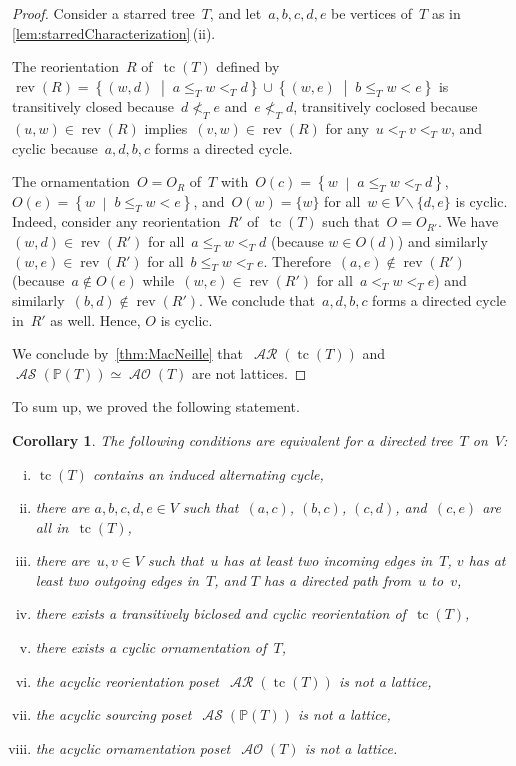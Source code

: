 \documentclass{amsart}
\newtheorem{corollary}[theorem]{Corollary}
\theoremstyle{definition}
\renewcommand{\c}[1]{\mathcal{#1}} %
\newcommand{\set}[2]{\left\{ #1 \;\middle|\; #2 \right\}} %
\newcommand{\ssm}{\smallsetminus} %
\DeclareMathOperator{\tc}{tc} %
\DeclareMathOperator{\AOrn}{\c{AO}}  %
\DeclareMathOperator{\AReori}{\c{AR}}  %
\DeclareMathOperator{\rev}{rev} %
\DeclareMathOperator{\ASour}{\mathcal{AS}}  %
\newcommand{\PP}{\mathbb P} %
\begin{document}
\begin{proof}
Consider a starred tree~$T$, and let~$a,b,c,d,e$ be vertices of~$T$ as in \cref{lem:starredCharacterization}\,(ii).

The reorientation~$R$ of~$\tc(T)$ defined by~$\rev(R) = \set{(w,d)}{a \le_T w <_T d} \cup \set{(w,e)}{b \le_T w < e}$ is transitively closed because~$d \not<_T e$ and~$e \not<_T d$, transitively coclosed because~$(u,w) \in \rev(R)$ implies~$(v,w) \in \rev(R)$ for any~$u <_T v <_T w$, and cyclic because~$a, d, b, c$ forms a directed cycle.

The ornamentation~$O = O_R$ of~$T$ with~$O(c) = \set{w}{a \le_T w <_T d}$, $O(e) = \set{w}{b \le_T w < e}$, and~$O(w) = \{w\}$ for all~$w \in V \ssm \{d,e\}$ is cyclic.
Indeed, consider any reorientation~$R'$ of~$\tc(T)$ such that~$O = O_{R'}$.
We have~$(w,d) \in \rev(R')$ for all~$a \le_T w <_T d$ (because $w \in O(d)$) and similarly~$(w,e) \in \rev(R')$ for all~$b \le_T w <_T e$.
Therefore~$(a,e) \notin \rev(R')$ (because~${a \notin O(e)}$ while~$(w,e) \in \rev(R')$ for all~$a <_T w <_T e$) and similarly~$(b,d) \notin \rev(R')$.
We conclude that~$a, d, b, c$ forms a directed cycle in~$R'$ as well.
Hence, $O$ is cyclic.

We conclude by~\cref{thm:MacNeille} that~$\AReori(\tc(T))$ and~$\ASour(\PP(T)) \simeq \AOrn(T)$ are not lattices.
\end{proof}

To sum up, we proved the following statement.

\begin{corollary}
\label{coro:starredCharacterizations}
The following conditions are equivalent for a directed tree~$T$ on~$V$:
\begin{enumerate}[(i)]
\item $\tc(T)$ contains an induced alternating cycle,
\item there are $a,b,c,d,e \in V$ such that~$(a,c)$, $(b,c)$, $(c,d)$, and~$(c,e)$ are all in~$\tc(T)$,
\item there are~$u,v \in V$ such that~$u$ has at least two incoming edges in~$T$, $v$ has at least two outgoing edges in~$T$, and $T$ has a directed path from~$u$ to~$v$,
\item there exists a transitively biclosed and cyclic reorientation of~$\tc(T)$,
\item there exists a cyclic ornamentation of~$T$,
\item the acyclic reorientation poset~$\AReori(\tc(T))$ is not a lattice,
\item the acyclic sourcing poset~$\ASour(\PP(T))$ is not a lattice,
\item the acyclic ornamentation poset~$\AOrn(T)$ is not a lattice.
\end{enumerate}
\end{corollary}
\end{document}
